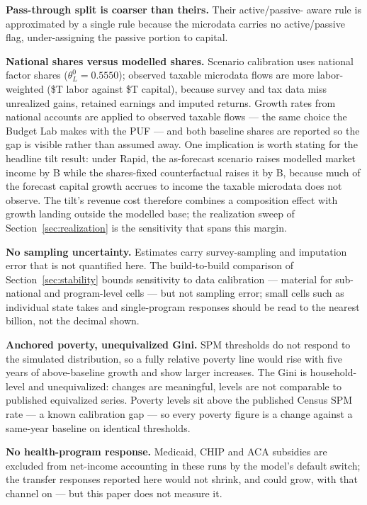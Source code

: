 \textbf{Pass-through split is coarser than theirs.} Their active/passive-%
aware rule is approximated by a single rule because the microdata carries no
active/passive flag, under-assigning the passive portion to capital.

\textbf{National shares versus modelled shares.} Scenario calibration uses
national factor shares ($\theta^0_L = 0.5550$); observed taxable microdata
flows are more labor-weighted (\$\genModelledLaborShareT T labor against
\$\genModelledCapitalShareT T capital), because survey and tax data miss
unrealized gains, retained earnings and imputed returns. Growth rates from
national accounts are applied to observed taxable flows --- the same choice
the Budget Lab makes with the PUF --- and both baseline shares are reported
so the gap is visible rather than assumed away. One implication is worth
stating for the headline tilt result: under Rapid, the as-forecast scenario
raises modelled market income by \genRapidPropMarketDelta B while the
shares-fixed counterfactual raises it by \genRapidFixedMarketDelta B,
because much of the forecast capital growth accrues to income the taxable
microdata does not observe. The tilt's revenue cost therefore combines a
composition effect with growth landing outside the modelled base; the
realization sweep of Section~\ref{sec:realization} is the sensitivity that
spans this margin.

\textbf{No sampling uncertainty.} Estimates carry survey-sampling and
imputation error that is not quantified here. The build-to-build comparison
of Section~\ref{sec:stability} bounds sensitivity to data calibration ---
material for sub-national and program-level cells --- but not sampling
error; small cells such as individual state takes and single-program
responses should be read to the nearest billion, not the decimal shown.

\textbf{Anchored poverty, unequivalized Gini.} SPM thresholds do not respond
to the simulated distribution, so a fully relative poverty line would rise
with five years of above-baseline growth and show larger increases. The
Gini is household-level and unequivalized: changes are meaningful, levels
are not comparable to published equivalized series. Poverty levels sit above
the published Census SPM rate \citep{census2025} --- a known calibration gap
--- so every poverty figure is a change against a same-year baseline on
identical thresholds.

\textbf{No health-program response.} Medicaid, CHIP and ACA subsidies are
excluded from net-income accounting in these runs by the model's default
switch; the transfer responses reported here would not shrink, and could
grow, with that channel on --- but this paper does not measure it.

